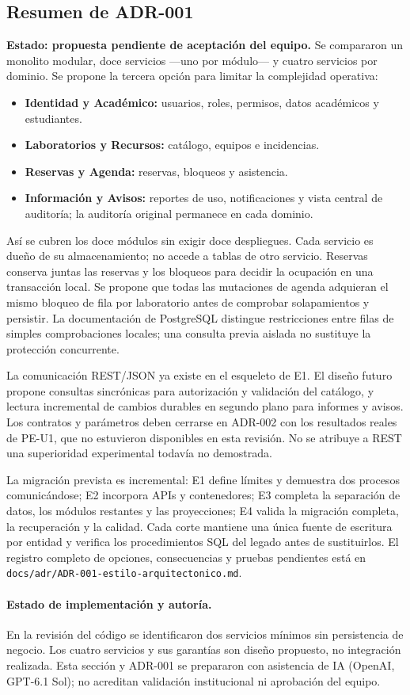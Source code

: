 \subsection{Resumen de ADR-001}

\textbf{Estado: propuesta pendiente de aceptación del equipo.} Se compararon
un monolito modular, doce servicios ---uno por módulo--- y cuatro servicios por
dominio. Se propone la tercera opción para limitar la complejidad operativa:
\begin{itemize}
  \item \textbf{Identidad y Académico:} usuarios, roles, permisos, datos
  académicos y estudiantes.
  \item \textbf{Laboratorios y Recursos:} catálogo, equipos e incidencias.
  \item \textbf{Reservas y Agenda:} reservas, bloqueos y asistencia.
  \item \textbf{Información y Avisos:} reportes de uso, notificaciones y vista
  central de auditoría; la auditoría original permanece en cada dominio.
\end{itemize}

Así se cubren los doce módulos sin exigir doce despliegues. Cada servicio es
dueño de su almacenamiento; no accede a tablas de otro servicio. Reservas
conserva juntas las reservas y los bloqueos para decidir la ocupación en una
transacción local. Se propone que todas las mutaciones de agenda adquieran el
mismo bloqueo de fila por laboratorio antes de comprobar solapamientos y
persistir. La documentación de PostgreSQL distingue restricciones entre filas
de simples comprobaciones locales; una consulta previa aislada no sustituye
la protección concurrente\cite{clabPostgresRestricciones}.

La comunicación REST/JSON ya existe en el esqueleto de E1. El diseño futuro
propone consultas sincrónicas para autorización y validación del catálogo,
y lectura incremental de cambios durables en segundo plano para informes y
avisos. Los contratos y parámetros deben cerrarse en ADR-002 con los resultados
reales de PE-U1, que no estuvieron disponibles en esta revisión. No se atribuye
a REST una superioridad experimental todavía no demostrada.

La migración prevista es incremental: E1 define límites y demuestra dos procesos
comunicándose; E2 incorpora APIs y contenedores; E3 completa la separación de
datos, los módulos restantes y las proyecciones; E4 valida la migración completa,
la recuperación y la calidad. Cada corte mantiene una única fuente de escritura
por entidad y verifica los procedimientos SQL del legado antes de sustituirlos.
El registro completo de opciones, consecuencias y pruebas pendientes está en
\texttt{docs/adr/ADR-001-estilo-arquitectonico.md}.

\paragraph{Estado de implementación y autoría.}
En la revisión del código se identificaron dos servicios mínimos sin persistencia
de negocio. Los cuatro servicios y sus garantías son diseño propuesto, no
integración realizada. Esta sección y ADR-001 se prepararon con asistencia de
IA (OpenAI, GPT-6.1 Sol); no acreditan validación institucional ni aprobación
del equipo.
